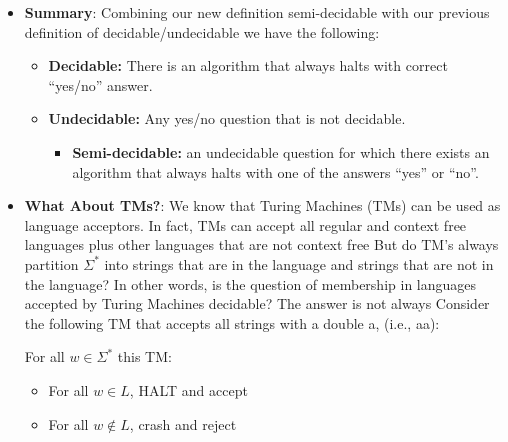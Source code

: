 \documentclass{report}
\begin{document}
\begin{itemize}
            \bigbreak \noindent 
            \begin{figure}[ht]
                \centering
                \label{fig:sd1}
            \end{figure}
        \item \textbf{Summary}: Combining our new definition semi-decidable with our previous definition of decidable/undecidable we have the following:
            \begin{itemize}
                \item \textbf{Decidable:} There is an algorithm that always halts with correct “yes/no” answer.
                \item \textbf{Undecidable:} Any yes/no question that is not decidable.
                    \begin{itemize}
                        \item \textbf{Semi-decidable:} an undecidable question for which there exists an algorithm that always halts with one of the answers “yes” or “no”.
                    \end{itemize}
            \end{itemize}
        \item \textbf{What About TMs?}: We know that Turing Machines (TMs) can be used as language acceptors.
            \bigbreak \noindent 
            In fact, TMs can accept all regular and context free languages plus other languages that are not context free
            \bigbreak \noindent 
            But do TM’s always partition $\Sigma^{*}$ into strings that are in the language and strings that are not in the language?
            \bigbreak \noindent 
            In other words, is the question of membership in languages accepted by Turing Machines decidable?
            \bigbreak \noindent 
            The answer is not always
            \pagebreak \bigbreak \noindent 
            Consider the following TM that accepts all strings with a double a, (i.e., aa):
            \bigbreak \noindent 
            \begin{figure}[ht]
                \centering
                \label{fig:tm1}
            \end{figure}
            \bigbreak \noindent 
            For all $w\in \Sigma^{*}$ this TM:
            \begin{itemize}
                \item For all $w \in L$, HALT and accept
                \item For all $w \not\in L$, crash and reject

\end{itemize}
\end{itemize}
\end{document}
